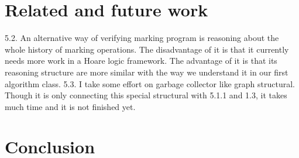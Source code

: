 \documentclass[pldi]{sigplanconf-pldi15}
\begin{document}
\section{Related and future work}

5.2. An alternative way of verifying marking program is reasoning about the whole history of marking operations. The disadvantage of it is that it currently needs more work in a Hoare logic framework. The advantage of it is that its reasoning structure are more similar with the way we understand it in our first algorithm class.
5.3. I take some effort on garbage collector like graph structural. Though it is only connecting this special structural with 5.1.1 and 1.3, it takes much time and it is not finished yet.

\section{Conclusion}



\end{document}
